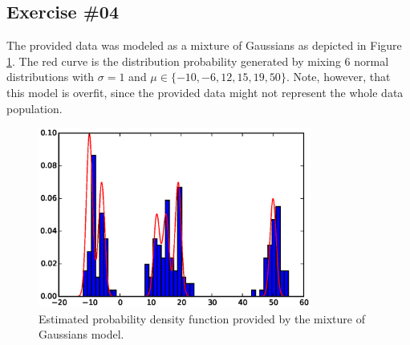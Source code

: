 \documentclass[a4paper,12pt]{article}
\begin{document}
\cleardoublepage
\subsection*{Exercise \#04}
The provided data was modeled as a mixture of Gaussians as depicted in Figure \ref{fig:4f1}. The red curve is the distribution probability generated by mixing 6 normal distributions with $\sigma=1$ and $\mu \in \{-10, -6, 12, 15, 19, 50\}$. Note, however, that this model is overfit, since the provided data might not represent the whole data population. 
\begin{figure}[htb]
 \centering
 \includegraphics[width=0.8\textwidth]{./figures/4f1.eps}
 \caption{Estimated probability density function provided by the mixture of Gaussians model.}
 \label{fig:4f1}
\end{figure}

\cleardoublepage
\end{document}
